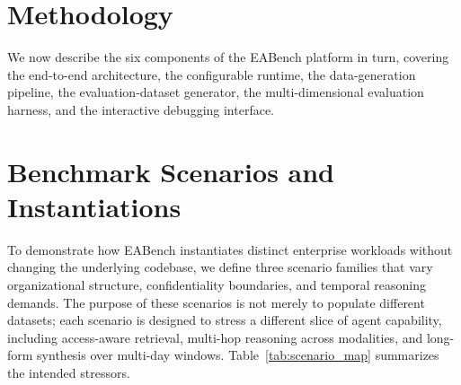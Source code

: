 \documentclass[journal,dvipsnames]{acmart}
\begin{document}
\section{Methodology}
\label{sec:method}

We now describe the six components of the EABench platform in turn, covering the end-to-end architecture, the configurable runtime, the data-generation pipeline, the evaluation-dataset generator, the multi-dimensional evaluation harness, and the interactive debugging interface.










\section{Benchmark Scenarios and Instantiations}
\label{sec:scenarios}

To demonstrate how EABench instantiates distinct enterprise workloads without changing the underlying codebase, we define three scenario families that vary organizational structure, confidentiality boundaries, and temporal reasoning demands. The purpose of these scenarios is not merely to populate different datasets; each scenario is designed to stress a different slice of agent capability, including access-aware retrieval, multi-hop reasoning across modalities, and long-form synthesis over multi-day windows. Table~\ref{tab:scenario_map} summarizes the intended stressors.
\end{document}
